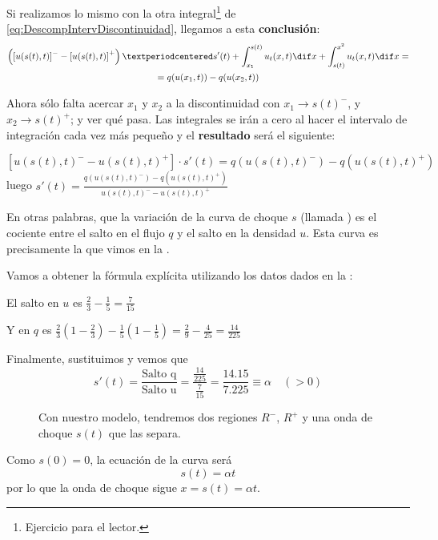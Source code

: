 		Si realizamos lo mismo con la otra integral\footnote{Ejercicio para el lector.} de \eqref{eq:DescompIntervDiscontinuidad}, llegamos a esta \textbf{conclusión}:
		\begin{multline*}
		\left(\left[u(s(t),t)\right]^{-} - \left[u(s(t),t)\right]^{+}\right)· s'(t) + \int^{s(t)}_{x_1} u_t(x,t) \dif x + \int^{x^2}_{s(t)} u_t(x,t) \dif x = \\ = q(u(x_1,t)) - q(u(x_2,t))
		\end{multline*}

		Ahora sólo falta acercar $x_1$ y $x_2$ a la discontinuidad con $x_1 \to s(t)^{-}$, y $x_2 \to s(t)^{+}$; y ver qué pasa. Las integrales se irán a cero al hacer el intervalo de integración cada vez más pequeño y el \textbf{resultado} será el siguiente:

		\[ \left[ u(s(t),t)^{-} - u(s(t),t)^{+} \right] · s'(t) = q(u(s(t),t)^{-}) - q(u(s(t),t)^{+}) \] luego
		\( s'(t) = \frac{q(u(s(t),t)^{-}) - q(u(s(t),t)^{+})}{u(s(t),t)^{-} - u(s(t),t)^{+}} \label{eq:DerivadaOndaChoque} \)

		En otras palabras, que la variación de la curva de choque $s$ (llamada ) es el cociente entre el salto en el flujo $q$ y el salto en la densidad $u$. Esta curva es precisamente la que vimos en la .

		\noindent Vamos a obtener la fórmula explícita utilizando los datos dados en la :

		El salto en $u$ es $\frac{2}{3} - \frac{1}{5} = \frac{7}{15}$

		Y en $q$ es $\frac{2}{3} (1-\frac{2}{3}) - \frac{1}{5}(1-\frac{1}{5}) = \frac{2}{9} - \frac{4}{25} = \frac{14}{225} $

		Finalmente, sustituimos y vemos que \[
		s'(t) = \frac{\text{Salto q}}{\text{Salto u}} = \frac{\frac{14}{225}}{\frac{7}{15}} = \frac{14.15}{7.225} \equiv \alpha \quad(>0) \]

		\begin{wrapfigure}[10]{R}{0.4\textwidth}
			\centering
			\vspace{-15pt}
			\vspace{-10pt}
			\caption{Con nuestro modelo, tendremos dos regiones $R^-$, $R^+$ y una onda de choque $s(t)$ que las separa.}
			\label{fig:OndaChoqueRPM}
		\end{wrapfigure}

		Como $s(0) = 0$, la ecuación de la curva será \[
		s(t) = \alpha t \]
		por lo que la onda de choque sigue $x = s(t) = \alpha t$.

